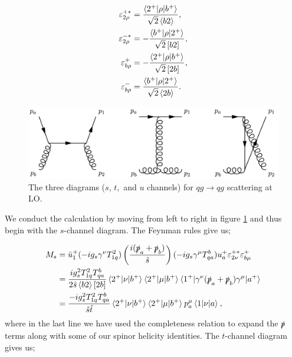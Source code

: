 \begin{subequations}
\begin{align}
\varepsilon_{2 \rho}^{+*} &= \frac{\mathinner{\langle2^+\vert\rho\vert b^+\rangle}_{}}{\sqrt{2} \left< b 2 \right>},\\
\varepsilon_{2 \rho}^{-*} &= -\frac{\mathinner{\langle b^+\vert\rho\vert2^+\rangle}_{}}{\sqrt{2} \left[ b 2 \right]}, \\
\varepsilon_{b \rho}^{+} &= -\frac{\mathinner{\langle2^+\vert\rho\vert b^+\rangle}_{}}{\sqrt{2} \left [ 2 b \right]}, \\
\varepsilon_{b \rho}^{-} &= \frac{\mathinner{\langle b^+\vert\rho\vert2^+\rangle}_{}}{\sqrt{2} \left< 2 b \right>}.
\end{align}
\end{subequations}

\begin{figure}[t]
\centering
\includegraphics[scale=0.25]{Images/qg_qg_scattering.png} 
\caption{The three diagrams ($s$, $t,$ and $u$ channels) for $qg \to qg$ scattering at LO.}
\label{fig:qg_qg_scat}
\end{figure}

We conduct the calculation by moving from left to right in figure \ref{fig:qg_qg_scat} and thus begin with the $s$-channel diagram. The Feynman rules give us; 

\begin{equation}
\begin{split}
M_s &= \bar{u}^+_1 (- i g_s \gamma^\nu T^2_{1q}) \left( \frac{i(\slashed{p}_a + \slashed{p}_b)}{\hat{s}}\right)(- ig_s \gamma^\mu T^b_{qa}) u_a^+ \varepsilon_{2 \nu}^{+*} \varepsilon_{b \mu}^+ \\
&= \frac{i g_s^2 T^2_{1q}T^b_{qa}}{2 \hat{s} \left<b 2 \right> [2b]} \mathinner{\langle2^+\vert\nu\vert b^+\rangle}_{} \mathinner{\langle2^+\vert\mu\vert b^+\rangle}_{} \mathinner{\langle1^+\vert\gamma^\nu (\slashed{p}_a + \slashed{p}_b) \gamma^\mu\vert a^+\rangle}_{} \\
&= \frac{-i g_s^2 T^2_{1q}T^b_{qa}}{\hat{s} \hat{t}} \mathinner{\langle2^+\vert\nu\vert b^+\rangle}_{} \mathinner{\langle2^+\vert\mu\vert b^+\rangle}_{} p_a^\mu \mathinner{\langle1\vert\nu\vert a\rangle}_{},
\end{split}
\end{equation}
where in the last line we have used the completeness relation to expand the $\slashed{p}$ terms along with some of our spinor helicity identities. The $t$-channel diagram gives us;

